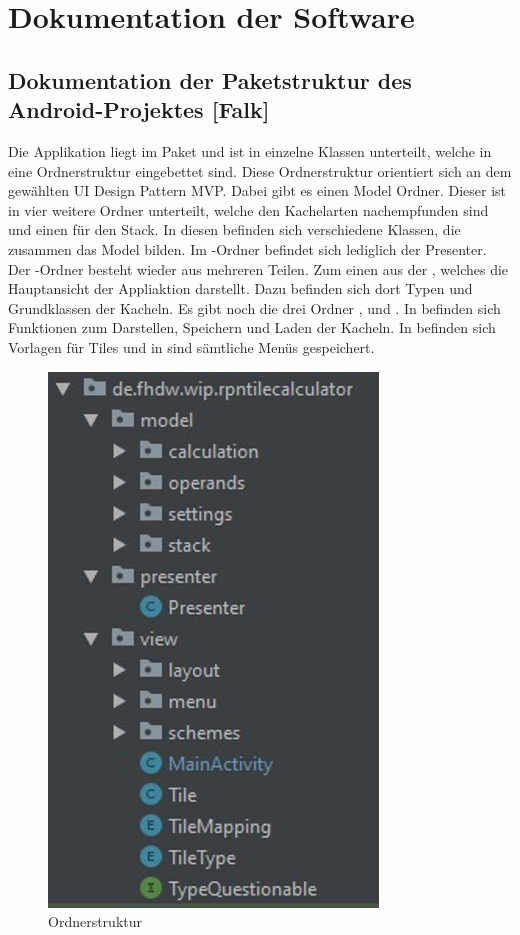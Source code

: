 \section{Dokumentation der Software}

\subsection{Dokumentation der Paketstruktur des Android-Projektes [Falk]}

Die Applikation liegt im Paket  und ist in einzelne Klassen unterteilt, welche in eine Ordnerstruktur eingebettet sind. Diese Ordnerstruktur orientiert sich an dem gewählten UI Design Pattern MVP. Dabei gibt es einen Model Ordner. Dieser ist in vier weitere Ordner unterteilt, welche den Kachelarten nachempfunden sind und einen für den Stack. In diesen befinden sich verschiedene Klassen, die zusammen das Model bilden. Im -Ordner befindet sich lediglich der Presenter. Der -Ordner besteht wieder aus mehreren Teilen. Zum einen aus der , welches die Hauptansicht der Appliaktion darstellt. Dazu befinden sich dort Typen und Grundklassen der Kacheln. Es gibt noch die drei Ordner ,  und . In  befinden sich Funktionen zum Darstellen, Speichern und Laden der Kacheln. In  befinden sich Vorlagen für Tiles und in  sind sämtliche Menüs gespeichert. 

\begin{figure}[!h]
	\includegraphics[scale=1]{img/ordnerstruktur}
	\caption[Ordnerstruktur]{Ordnerstruktur\footnotemark}
\end{figure}

